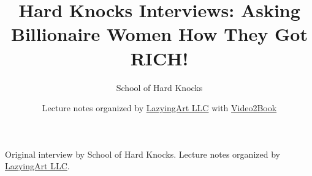 \documentclass[11pt,oneside]{book}
\begin{document}
\frontmatter
\title{Hard Knocks Interviews: Asking Billionaire Women How They Got RICH!}
\author{School of Hard Knocks}
\date{Lecture notes organized by \href{https://lazying.art}{LazyingArt LLC} with \href{https://github.com/lachlanchen/Video2Book}{Video2Book}}
\maketitle
\begin{center}
\small Original interview by School of Hard Knocks. Lecture notes organized by \href{https://lazying.art}{LazyingArt LLC}.
\end{center}
\clearpage
\mainmatter

\end{document}
